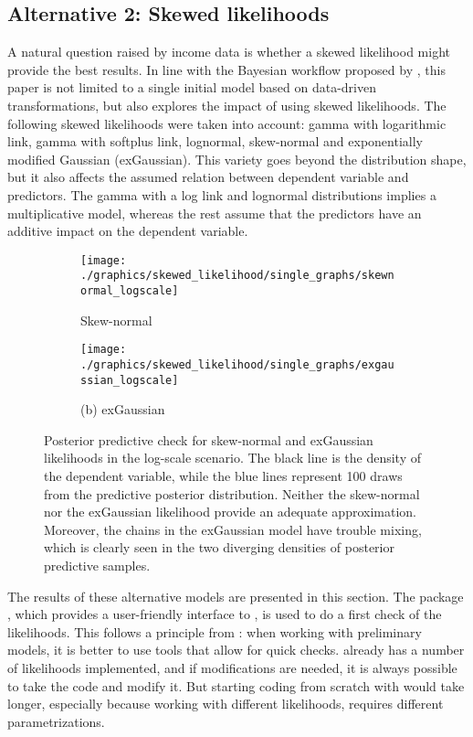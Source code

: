 \subsection{Alternative 2: Skewed likelihoods}
\label{ch:skewed_likelihoods}
A natural question raised by income data is whether a skewed likelihood might provide the best results.
In line with the Bayesian workflow proposed by \cite{gelman_bayesian_2020}, this paper is not limited to a single initial model based on data-driven transformations, but also explores the impact of using skewed likelihoods.
The following skewed likelihoods were taken into account: gamma with logarithmic link, gamma with
softplus link, lognormal, skew-normal and exponentially modified Gaussian (exGaussian).
This variety goes beyond the distribution shape, but it also affects the assumed relation between dependent variable and predictors.
The gamma with a log link and lognormal distributions implies a multiplicative model, whereas the rest assume that the predictors have an additive impact on the dependent variable.

\begin{figure}[h]
    \centering
    \begin{subfigure}{0.45\linewidth}
        \centering
        \texttt{[image: ./graphics/skewed\_likelihood/single\_graphs/skewnormal\_logscale]}
        \caption{Skew-normal}
        \label{fig:logscale_skewnormal}
    \end{subfigure}
    \begin{subfigure}{0.45\linewidth}
        \centering
        \texttt{[image: ./graphics/skewed\_likelihood/single\_graphs/exgaussian\_logscale]}
        \caption{(b) exGaussian}
        \label{fig:logscale_exgaussian}
    \end{subfigure}

    \caption[Posterior predictive check for skew-normal and exGaussian likelihoods.]{Posterior predictive check for skew-normal and exGaussian likelihoods  in the log-scale scenario. The black line is the density of the dependent variable, while the blue lines represent 100 draws from the predictive posterior distribution. Neither the skew-normal nor the exGaussian likelihood provide an adequate approximation. Moreover, the chains in the exGaussian model have trouble mixing, which is clearly seen in the two diverging densities of posterior predictive samples.}
    \label{fig:logscale_misfit}
\end{figure}

The results of these alternative models are presented in this section.
The package  \citep{burkner_brms_2017}, which provides a user-friendly interface to , is used to do a first check of the likelihoods.
This follows a principle from \cite{gelman_bayesian_2020}: when working with preliminary models, it is better to use tools that allow for quick checks.
 already has a number of likelihoods implemented, and if modifications are needed, it is always possible to take the  code and modify it.
But starting coding from scratch with  would take longer, especially because working with different likelihoods, requires different parametrizations.

